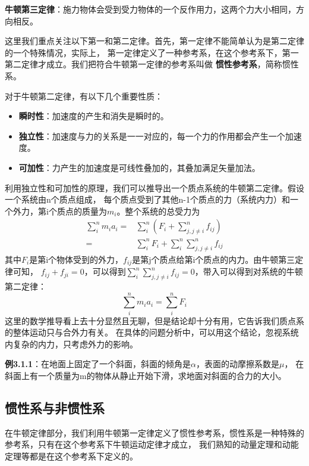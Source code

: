 \documentclass{article}
\begin{document}
    \textbf{牛顿第三定律}：施力物体会受到受力物体的一个反作用力，这两个力大小相同，方向相反。

    这里我们重点关注以下第一和第二定律。首先，第一定律不能简单认为是第二定律的一个特殊情况，实际上，
    第一定律定义了一种参考系，在这个参考系下，第一第二定律才成立。我们把符合牛顿第一定律的参考系叫做
    \textbf{惯性参考系}，简称惯性系。

    对于牛顿第二定律，有以下几个重要性质：
    \begin{itemize}[itemsep=-5pt]
        \item \textbf{瞬时性}：加速度的产生和消失是瞬时的。
        \item \textbf{独立性}：加速度与力的关系是一一对应的，每一个力的作用都会产生一个加速度。
        \item \textbf{可加性}：力产生的加速度是可线性叠加的，其叠加满足矢量加法。
    \end{itemize}
    利用独立性和可加性的原理，我们可以推导出一个质点系统的牛顿第二定律。假设一个系统由n个质点组成，
    每个质点受到了其他n-1个质点的力（系统内力）和一个外力，第i个质点的质量为\(m_i\)。整个系统的总受力为
    \begin{align*}
        \sum_i^n m_i a_i =& \sum_i^n (F_i +  \sum_{j,j\ne i}^{n}f_{ij}) \\
                         =& \sum_i^n F_i + \sum_i^n \sum_{j,j\ne i}^{n}f_{ij}
    \end{align*}
    其中\(F_i\)是第i个物体受到的外力，\(f_{ij}\)是第j个质点给第i个质点的内力。由牛顿第三定律可知，
    \(f_{ij} + f_{ji} = 0\)，可以得到\(\displaystyle \sum_{i}^{n} \sum_{j,j\ne i}^{n}f_{ij} = 0\)，带入可以得到对系统的牛顿第二定律：
    \begin{equation*}
        \sum_i^n m_i a_i = \sum_i^n F_i
    \end{equation*}
    这里的数学推导看上去十分显然且无聊，但是结论却十分有用，它告诉我们质点系的整体运动只与合外力有关。
    在具体的问题分析中，可以用这个结论，忽视系统内复杂的内力，只考虑外力的影响。

    \textbf{例3.1.1}：在地面上固定了一个斜面，斜面的倾角是\(\alpha\)，表面的动摩擦系数是\(\mu\)，
    在斜面上有一个质量为m的物体从静止开始下滑，求地面对斜面的合力的大小。

    \subsection{惯性系与非惯性系}
    在牛顿定律部分，我们利用牛顿第一定律定义了惯性参考系，惯性系是一种特殊的参考系，只有在这个参考系下牛顿运动定律才成立，
    我们熟知的动量定理和动能定理等都是在这个参考系下定义的。
\end{document}
